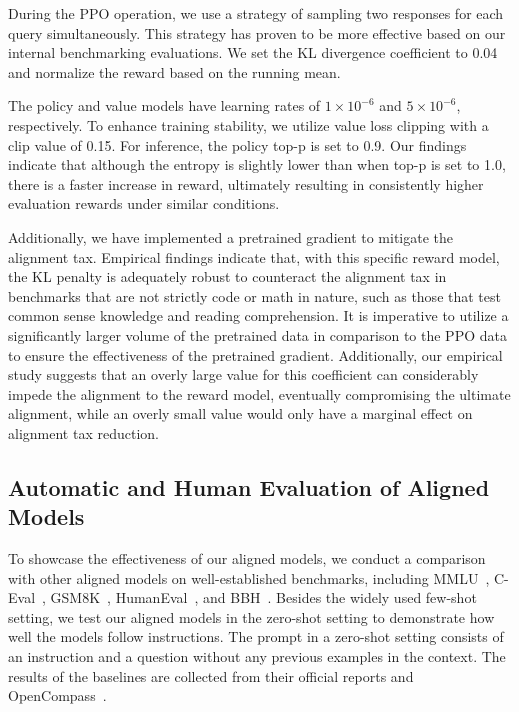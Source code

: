 During the PPO operation, we use a strategy of sampling two responses for each query simultaneously. This strategy has proven to be more effective based on our internal benchmarking evaluations. We set the KL divergence coefficient to \num{0.04} and normalize the reward based on the running mean. 

The policy and value models have learning rates of $1 \times 10^{-6}$ and $5 \times 10^{-6}$, respectively. To enhance training stability, we utilize value loss clipping with a clip value of \num{0.15}. For inference, the policy top-p is set to \num{0.9}. Our findings indicate that although the entropy is slightly lower than when top-p is set to \num{1.0}, there is a faster increase in reward, ultimately resulting in consistently higher evaluation rewards under similar conditions.

Additionally, we have implemented a pretrained gradient to mitigate the alignment tax. Empirical findings indicate that, with this specific reward model, the KL penalty is adequately robust to counteract the alignment tax in benchmarks that are not strictly code or math in nature, such as those that test common sense knowledge and reading comprehension. It is imperative to utilize a significantly larger volume of the pretrained data in comparison to the PPO data to ensure the effectiveness of the pretrained gradient. Additionally, our empirical study suggests that an overly large value for this coefficient can considerably impede the alignment to the reward model, eventually compromising the ultimate alignment, while an overly small value would only have a marginal effect on alignment tax reduction.

\subsection{Automatic and Human Evaluation of Aligned Models}

To showcase the effectiveness of our aligned models, we conduct a comparison with other aligned models on well-established benchmarks, including MMLU~\citep{mmlu}, C-Eval~\citep{ceval}, GSM8K~\citep{gsm8k}, HumanEval~\citep{codex}, and BBH~\citep{bbh}. Besides the widely used few-shot setting, we test our aligned models in the zero-shot setting to demonstrate how well the models follow instructions. The prompt in a zero-shot setting consists of an instruction and a question without any previous examples in the context. The results of the baselines are collected from their official reports and OpenCompass~\citep{opencompass}.

